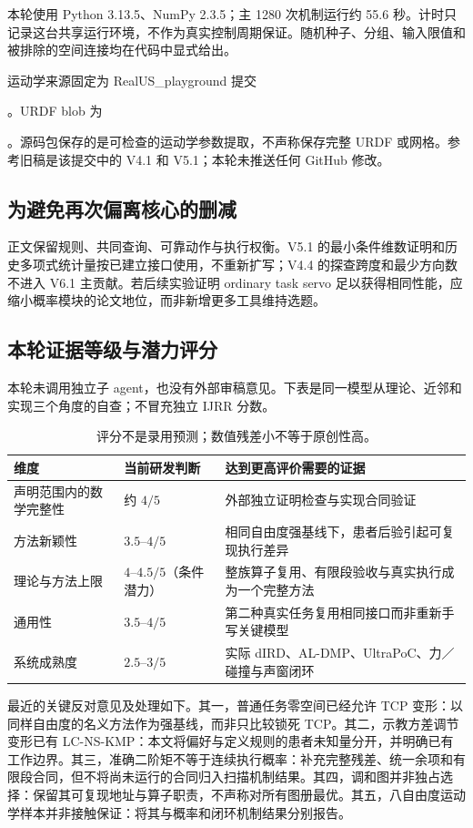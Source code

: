 \documentclass[UTF8,11pt,a4paper,fontset=fandol]{ctexart}
\numberwithin{equation}{section}
\theoremstyle{definition}
\begin{document}
本轮使用 Python 3.13.5、NumPy 2.3.5；主 1280 次机制运行约 55.6 秒。计时只记录这台共享运行环境，不作为真实控制周期保证。随机种子、分组、输入限值和被排除的空间连接均在代码中显式给出。

运动学来源固定为 RealUS\_playground 提交\par\noindent{}。URDF blob 为\par\noindent{}。源码包保存的是可检查的运动学参数提取，不声称保存完整 URDF 或网格。参考旧稿是该提交中的 V4.1 和 V5.1；本轮未推送任何 GitHub 修改。

\subsection{为避免再次偏离核心的删减}
正文保留规则、共同查询、可靠动作与执行权衡。V5.1 的最小条件维数证明和历史多项式统计量按已建立接口使用，不重新扩写；V4.4 的探查跨度和最少方向数不进入 V6.1 主贡献。若后续实验证明 ordinary task servo 足以获得相同性能，应缩小概率模块的论文地位，而非新增更多工具维持选题。

\subsection{本轮证据等级与潜力评分}
本轮未调用独立子 agent，也没有外部审稿意见。下表是同一模型从理论、近邻和实现三个角度的自查；不冒充独立 IJRR 分数。
\begin{table}[ht]\centering\small
\begin{tabularx}{\linewidth}{p{.28\linewidth}p{.16\linewidth}Y}
\toprule
维度 & 当前研发判断 & 达到更高评价需要的证据\\\midrule
声明范围内的数学完整性 & 约 $4/5$ & 外部独立证明检查与实现合同验证\\
方法新颖性 & $3.5$--$4/5$ & 相同自由度强基线下，患者后验引起可复现执行差异\\
理论与方法上限 & $4$--$4.5/5$（条件潜力） & 整族算子复用、有限段验收与真实执行成为一个完整方法\\
通用性 & $3.5$--$4/5$ & 第二种真实任务复用相同接口而非重新手写关键模型\\
系统成熟度 & $2.5$--$3/5$ & 实际 dIRD、AL-DMP、UltraPoC、力／碰撞与声窗闭环\\
\bottomrule
\end{tabularx}
\caption{评分不是录用预测；数值残差小不等于原创性高。}
\end{table}

最近的关键反对意见及处理如下。其一，普通任务零空间已经允许 TCP 变形：以同样自由度的名义方法作为强基线，而非只比较锁死 TCP。其二，示教方差调节变形已有 LC-NS-KMP：本文将偏好与定义规则的患者未知量分开，并明确已有工作边界。其三，准确二阶矩不等于连续执行概率：补充完整残差、统一余项和有限段合同，但不将尚未运行的合同归入扫描机制结果。其四，调和图并非独占选择：保留其可复现地址与算子职责，不声称对所有图册最优。其五，八自由度运动学样本并非接触保证：将其与概率和闭环机制结果分别报告。
\end{document}
